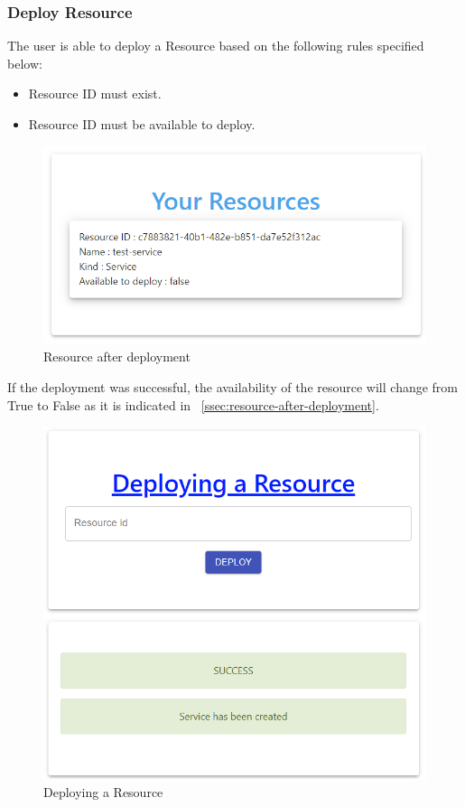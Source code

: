 \subsubsection{Deploy Resource}
The user is able to deploy a Resource based on the following rules specified below:
\begin{itemize}
  \item Resource ID must exist.
  \item Resource ID must be available to deploy.
\end{itemize}

\begin{figure}[H]
	\centering
	\includegraphics[width=140mm]{images/your-resource-2.png}
	\caption{Resource after deployment}
	\label{ssec:resource-after-deployment}
\end{figure}

If the deployment was successful, the availability of the resource will change from True to False as it is indicated in ~\autoref{ssec:resource-after-deployment}.

\begin{figure}[H]
	\centering
	\includegraphics[width=130mm]{images/deploy-service.png}
	\caption{Deploying a Resource}
	\label{ssec:deploy-a-resource}
\end{figure}

